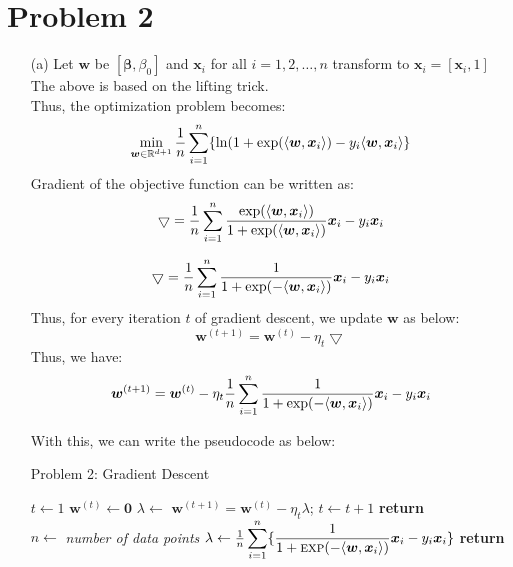 \documentclass[fleqn]{article}
\begin{document}
\section{Problem 2}{}
\begin{itemize}
	\item[(a)]
	Let $\bm{w}$ be $[\bm{\beta}, \beta_0]$ and $\bm{x}_i$ for all $i = 1, 2, \dots, n$ transform to $\bm{x}_i = [\bm{x}_i, 1]$\\
	The above is based on the lifting trick.\\
	Thus, the optimization problem becomes:
	\[
		\min_{\bm{w} \in \mathbb{R}^{d+1}}
			\frac{1}{n} \smashoperator{\sum_{i = 1}^{n}}
				\{\ln(1 + \exp(\langle \bm{w}, \bm{x}_i \rangle) - y_i \langle \bm{w}, \bm{x}_i \rangle\}
	\]
	Gradient of the objective function can be written as:\\
	\[
		\bigtriangledown = \frac{1}{n} \smashoperator{\sum_{i=1}^{n}} \frac{\exp(\langle \bm{w}, \bm{x}_i \rangle)}
										  {1 + \exp(\langle \bm{w}, \bm{x}_i \rangle)} \bm{x}_i - y_i \bm{x}_i
	\]

	\[
		\bigtriangledown = \frac{1}{n} \smashoperator{\sum_{i=1}^{n}} \frac{1}
										  {1 + \exp(-\langle \bm{w}, \bm{x}_i \rangle)} \bm{x}_i - y_i \bm{x}_i
	\]
	Thus, for every iteration $t$ of gradient descent, we update $\bm{w}$ as below:\\
	\[\bm{w}^{(t+1)} = \bm{w}^{(t)} - \eta_t\bigtriangledown\]
	Thus, we have:
	\[
		\bm{w}^{(t+1)} = \bm{w}^{(t)} - \eta_t
					\frac{1}{n} \smashoperator{\sum_{i=1}^{n}}
					\frac{1}{1 + \exp(-\langle \bm{w}, \bm{x}_i \rangle)} \bm{x}_i - y_i \bm{x}_i
	\]

	With this, we can write the pseudocode as below:\\
	\begin{algorithm}[H]
	\caption{Problem 2: Gradient Descent}
	\begin{algorithmic}
		\State $t \gets 1$
		\State $\bm{w}^{(t)} \gets \bm{0}$
			\State $\lambda \gets$ 
			\State $\bm{w}^{(t+1)} = \bm{w}^{(t)} - \eta_t \lambda$; 
			\State $t \gets t + 1$
		\EndFor
		\State \textbf{return}   
		\EndProcedure
	\\
		\State $n \gets$ \textit{number of data points} 
		\State $\lambda \gets \frac{1}{n} \smashoperator{\sum_{i = 1}^{n}}
				\{ \frac{1}{1 + \Call{exp}{-\langle \bm{w}, \bm{x}_i \rangle}} \bm{x}_i - y_i \bm{x}_i \}$
		\State \textbf{return} \lambda
		\EndProcedure
	\end{algorithmic}
	\end{algorithm}


\end{itemize}
\end{document}
